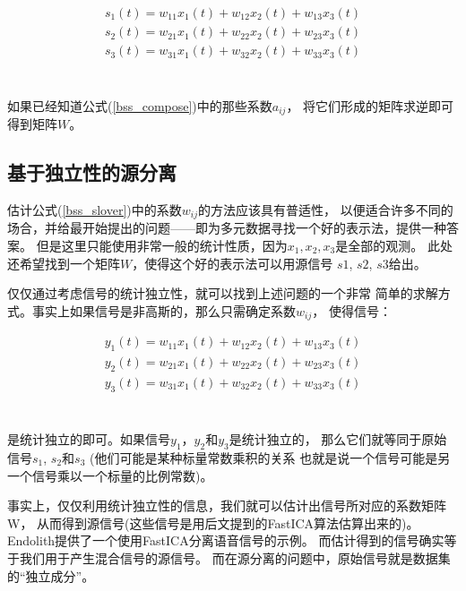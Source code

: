 \parbox{10cm}{
\begin{eqnarray*}
s_1(t)=w_{11}x_1(t)+w_{12}x_2(t)+w_{13}x_3(t) \\
s_2(t)=w_{21}x_1(t)+w_{22}x_2(t)+w_{23}x_3(t) \\
s_3(t)=w_{31}x_1(t)+w_{32}x_2(t)+w_{33}x_3(t) \\
\end{eqnarray*}
}\hfill
\parbox{3cm}{\begin{eqnarray}\label{bss_slover} \end{eqnarray}}

如果已经知道公式(\ref{bss_compose})中的那些系数$a_{ij}$，
将它们形成的矩阵求逆即可得到矩阵$W$。
    
\subsection{基于独立性的源分离}
估计公式(\ref{bss_slover})中的系数$w_{ij}$的方法应该具有普适性，
以便适合许多不同的场合，并给最开始提出的问题——即为多元数据寻找一个好的表示法，提供一种答案。
但是这里只能使用非常一般的统计性质，因为$x_1, x_2, x_3$是全部的观测。
此处还希望找到一个矩阵$W$，使得这个好的表示法可以用源信号
$s1$, $s2$, $s3$给出。

仅仅通过考虑信号的统计独立性，就可以找到上述问题的一个非常
简单的求解方式。事实上如果信号是非高斯的，那么只需确定系数$w_{ij}$，
使得信号：\\
\parbox{10cm}{
\begin{eqnarray*}
y_1(t)=w_{11}x_1(t)+w_{12}x_2(t)+w_{13}x_3(t) \\
y_2(t)=w_{21}x_1(t)+w_{22}x_2(t)+w_{23}x_3(t) \\
y_3(t)=w_{31}x_1(t)+w_{32}x_2(t)+w_{33}x_3(t) \\
\end{eqnarray*}
}\hfill
\parbox{3cm}{\begin{eqnarray}\label{bss_slover} \end{eqnarray}}

是统计独立的即可。如果信号$y_1$，$y_2$和$y_3$是统计独立的，
那么它们就等同于原始信号$s_1$, $s_2$和$s_3$
(他们可能是某种标量常数乘积的关系
也就是说一个信号可能是另一个信号乘以一个标量的比例常数)。

事实上，仅仅利用统计独立性的信息，我们就可以估计出信号所对应的系数矩阵W，
从而得到源信号(这些信号是用后文提到的FastICA算法估算出来的)。
Endolith提供了一个使用FastICA分离语音信号的示例。
而估计得到的信号确实等于我们用于产生混合信号的源信号。
而在源分离的问题中，原始信号就是数据集的“独立成分”。


